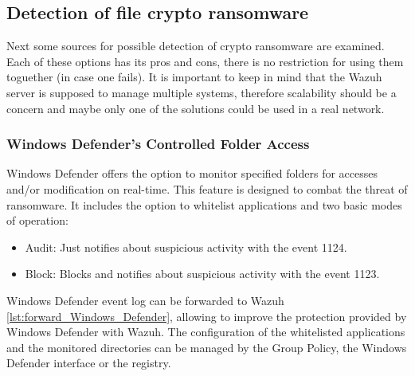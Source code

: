\subsection{Detection of file crypto ransomware}
Next some sources for possible detection of crypto ransomware are examined.
Each of these options has its pros and cons, there is no restriction for using them toguether (in case one fails).
It is important to keep in mind that the Wazuh server is supposed to manage multiple systems, therefore scalability should be a concern and maybe only one of the solutions could be used in a real network.

\subsubsection{Windows Defender's Controlled Folder Access}
Windows Defender offers the option to monitor specified folders for accesses and/or modification on real-time.
This feature is designed to combat the threat of ransomware.
It includes the option to whitelist applications and two basic modes of operation\cite{hardening_windows_10}:
\begin{itemize}
	\item Audit: Just notifies about suspicious activity with the event 1124.
	\item Block: Blocks and notifies about suspicious activity with the event 1123.
\end{itemize}
\linej
Windows Defender event log can be forwarded to Wazuh \ref{lst:forward_Windows_Defender}, allowing to improve the protection provided by Windows Defender with Wazuh.
The configuration of the whitelisted applications and the monitored directories can be managed by the Group Policy, the Windows Defender interface or the registry.

